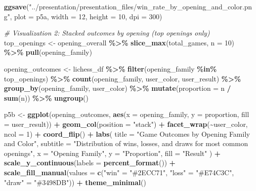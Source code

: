 \documentclass[
]{article}
\newenvironment{Shaded}{\begin{snugshade}}{\end{snugshade}}
\newcommand{\AttributeTok}[1]{\textcolor[rgb]{0.13,0.29,0.53}{#1}}
\newcommand{\CommentTok}[1]{\textcolor[rgb]{0.56,0.35,0.01}{\textit{#1}}}
\newcommand{\DecValTok}[1]{\textcolor[rgb]{0.00,0.00,0.81}{#1}}
\newcommand{\FunctionTok}[1]{\textcolor[rgb]{0.13,0.29,0.53}{\textbf{#1}}}
\newcommand{\NormalTok}[1]{#1}
\newcommand{\OtherTok}[1]{\textcolor[rgb]{0.56,0.35,0.01}{#1}}
\newcommand{\SpecialCharTok}[1]{\textcolor[rgb]{0.81,0.36,0.00}{\textbf{#1}}}
\newcommand{\StringTok}[1]{\textcolor[rgb]{0.31,0.60,0.02}{#1}}
\begin{document}
\begin{Shaded}
\begin{Highlighting}[]
\FunctionTok{ggsave}\NormalTok{(}\StringTok{"../presentation/presentation\_files/win\_rate\_by\_opening\_and\_color.png"}\NormalTok{, }\AttributeTok{plot =}\NormalTok{ p5a, }\AttributeTok{width =} \DecValTok{12}\NormalTok{, }\AttributeTok{height =} \DecValTok{10}\NormalTok{, }\AttributeTok{dpi =} \DecValTok{300}\NormalTok{)}

\CommentTok{\# Visualization 2: Stacked outcomes by opening (top openings only)}
\NormalTok{top\_openings }\OtherTok{\textless{}{-}}\NormalTok{ opening\_overall }\SpecialCharTok{\%\textgreater{}\%}
  \FunctionTok{slice\_max}\NormalTok{(total\_games, }\AttributeTok{n =} \DecValTok{10}\NormalTok{) }\SpecialCharTok{\%\textgreater{}\%}
  \FunctionTok{pull}\NormalTok{(opening\_family)}

\NormalTok{opening\_outcomes }\OtherTok{\textless{}{-}}\NormalTok{ lichess\_df }\SpecialCharTok{\%\textgreater{}\%}
  \FunctionTok{filter}\NormalTok{(opening\_family }\SpecialCharTok{\%in\%}\NormalTok{ top\_openings) }\SpecialCharTok{\%\textgreater{}\%}
  \FunctionTok{count}\NormalTok{(opening\_family, user\_color, user\_result) }\SpecialCharTok{\%\textgreater{}\%}
  \FunctionTok{group\_by}\NormalTok{(opening\_family, user\_color) }\SpecialCharTok{\%\textgreater{}\%}
  \FunctionTok{mutate}\NormalTok{(}\AttributeTok{proportion =}\NormalTok{ n }\SpecialCharTok{/} \FunctionTok{sum}\NormalTok{(n)) }\SpecialCharTok{\%\textgreater{}\%}
  \FunctionTok{ungroup}\NormalTok{()}

\NormalTok{p5b }\OtherTok{\textless{}{-}} \FunctionTok{ggplot}\NormalTok{(opening\_outcomes, }\FunctionTok{aes}\NormalTok{(}\AttributeTok{x =}\NormalTok{ opening\_family, }\AttributeTok{y =}\NormalTok{ proportion, }\AttributeTok{fill =}\NormalTok{ user\_result)) }\SpecialCharTok{+}
  \FunctionTok{geom\_col}\NormalTok{(}\AttributeTok{position =} \StringTok{"stack"}\NormalTok{) }\SpecialCharTok{+}
  \FunctionTok{facet\_wrap}\NormalTok{(}\SpecialCharTok{\textasciitilde{}}\NormalTok{user\_color, }\AttributeTok{ncol =} \DecValTok{1}\NormalTok{) }\SpecialCharTok{+}
  \FunctionTok{coord\_flip}\NormalTok{() }\SpecialCharTok{+}
  \FunctionTok{labs}\NormalTok{(}
    \AttributeTok{title =} \StringTok{"Game Outcomes by Opening Family and Color"}\NormalTok{,}
    \AttributeTok{subtitle =} \StringTok{"Distribution of wins, losses, and draws for most common openings"}\NormalTok{,}
    \AttributeTok{x =} \StringTok{"Opening Family"}\NormalTok{,}
    \AttributeTok{y =} \StringTok{"Proportion"}\NormalTok{,}
    \AttributeTok{fill =} \StringTok{"Result"}
\NormalTok{  ) }\SpecialCharTok{+}
  \FunctionTok{scale\_y\_continuous}\NormalTok{(}\AttributeTok{labels =} \FunctionTok{percent\_format}\NormalTok{()) }\SpecialCharTok{+}
  \FunctionTok{scale\_fill\_manual}\NormalTok{(}\AttributeTok{values =} \FunctionTok{c}\NormalTok{(}\StringTok{"win"} \OtherTok{=} \StringTok{"\#2ECC71"}\NormalTok{, }\StringTok{"loss"} \OtherTok{=} \StringTok{"\#E74C3C"}\NormalTok{, }\StringTok{"draw"} \OtherTok{=} \StringTok{"\#3498DB"}\NormalTok{)) }\SpecialCharTok{+}
  \FunctionTok{theme\_minimal}\NormalTok{()}


\end{Highlighting}
\end{Shaded}
\end{document}

